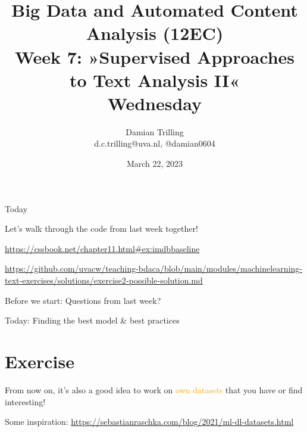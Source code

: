 

\graphicspath{{../../resources/img/}}




\title[Big Data and Automated Content Analysis]{\textbf{Big Data and Automated Content Analysis (12EC)} 
\\Week 7: »Supervised Approaches to Text Analysis II«
\\Wednesday}
\author[Damian Trilling]{Damian Trilling\\ \footnotesize{d.c.trilling@uva.nl, @damian0604 \\}}
\date{March 22, 2023}


\begin{frame}{}
	\titlepage
\end{frame}

\begin{frame}{Today}
	\tableofcontents
\end{frame}


\begin{frame}[standout]
Let's walk through the code from last week together!

\url{https://cssbook.net/chapter11.html\#ex:imdbbaseline}

\url{https://github.com/uvacw/teaching-bdaca/blob/main/modules/machinelearning-text-exercises/solutions/exercise2-possible-solution.md}


\end{frame}



\begin{frame}[standout]
Before we start: Questions from last week?
\end{frame}


\begin{frame}[standout]
Today: Finding the best model \& best practices
\end{frame}









\section{Exercise}

\begin{frame}[standout]
From now on, it's also a good idea to work on \textcolor{orange}{own datasets} that you have or find interesting!

Some inspiration: \url{https://sebastianraschka.com/blog/2021/ml-dl-datasets.html}

\end{frame}





